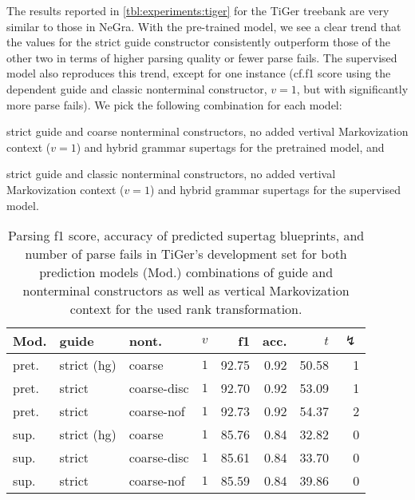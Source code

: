 \documentclass[../../document.tex]{subfiles}
\begin{document}
    The results reported in \cref{tbl:experiments:tiger} for the TiGer treebank are very similar to those in NeGra.
    With the pre-trained model, we see a clear trend that the values for the strict guide constructor consistently outperform those of the other two in terms of higher parsing quality or fewer parse fails.
    The supervised model also reproduces this trend, except for one instance (cf.\@ f1 score using the dependent guide and classic nonterminal constructor, $v=1$, but with significantly more parse fails).
    We pick the following combination for each model:
    \begin{compactitem}
        \item strict guide and coarse nonterminal constructors, no added vertival Markovization context ($v=1$) and hybrid grammar supertags for the pretrained model, and
        \item strict guide and classic nonterminal constructors, no added vertival Markovization context ($v=1$) and hybrid grammar supertags for the supervised model.
    \end{compactitem}

    \begin{table}
        \caption{\label{tbl:experiments:tiger:dcp}
        Parsing f1 score, accuracy of predicted  supertag blueprints, and number of parse fails in TiGer's development set for both prediction models (Mod.) combinations of guide and nonterminal constructors as well as vertical Markovization context for the used rank transformation.
        }
        \centering
        \setlength{\tabcolsep}{4pt}
        \vspace{.2cm}
        \begin{tabular}{lllc|rrrr}
            \toprule
Mod. &  guide &   nont.   &\(v\)   & f1 & acc. & $t$ & $\lightning$ \\ \hline \rowcolor{black!10}
pret. & strict (hg) &  coarse & \(1\)  & 92.75 & 0.92 & 50.58 & 1  \\\hline
pret. & strict    &  coarse-disc & \(1\)  & 92.70 & 0.92 & 53.09 & 1  \\
pret. & strict     &  coarse-nof & \(1\)  & 92.73 & 0.92 & 54.37 & 2  \\
\midrule \rowcolor{black!10}
sup. & strict (hg) &  coarse & \(1\)  & 85.76 & 0.84 & 32.82 & 0  \\\hline
sup. & strict    &  coarse-disc & \(1\)  & 85.61 & 0.84 & 33.70 & 0  \\
sup. & strict     &  coarse-nof & \(1\)  & 85.59 & 0.84 & 39.86 & 0  \\
    \bottomrule
        \end{tabular}
    \end{table}
\end{document}
